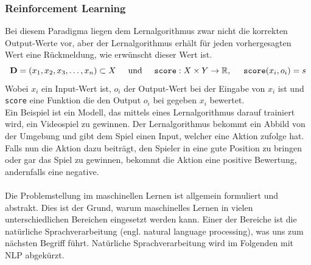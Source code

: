 \documentclass[12pt,letterpaper,ngerman]{article}
\begin{document}
\subsubsection{Reinforcement Learning}
Bei diesem Paradigma liegen dem Lernalgorithmus zwar nicht die korrekten 
Output-Werte vor, aber der Lernalgorithmus erhält für jeden vorhergesagten Wert 
eine Rückmeldung, wie erwünscht dieser Wert ist. 
\[ 
  \mathbf{D} = (x_1, x_2, x_3, \dots, x_n) \subset X 
  \hspace{0.5cm}
  \text{und}
  \hspace{0.5cm}
  \texttt{score}: X \times Y \to \mathbb{R},
  \hspace{0.5cm}
  \texttt{score}(x_i, o_i) = s
\]
Wobei $x_i$ ein Input-Wert ist, $o_i$ der Output-Wert bei der 
Eingabe von $x_i$ ist und \texttt{score} eine Funktion die 
den Output $o_i$ bei gegeben $x_i$ bewertet.\\
Ein Beispiel ist ein Modell,
das mittels eines Lernalgorithmus darauf trainiert wird, ein Videospiel zu 
gewinnen. Der Lernalgorithmus bekommt ein Abbild von der Umgebung und gibt dem 
Spiel einen Input, welcher eine Aktion zufolge hat. Falls nun die Aktion dazu 
beiträgt, den Spieler in eine gute Position zu bringen oder gar das Spiel zu
gewinnen, bekommt die Aktion eine positive Bewertung, andernfalls eine
negative.\\\\
Die Problemstellung im maschinellen Lernen ist allgemein formuliert und abstrakt.
Dies ist der Grund, warum maschinelles Lernen in vielen unterschiedlichen 
Bereichen eingesetzt werden kann. Einer der Bereiche ist die natürliche
Sprachverarbeitung (engl. natural language processing), was uns zum nächsten 
Begriff führt. Natürliche Sprachverarbeitung wird im Folgenden 
mit NLP abgekürzt.
\pagebreak
\end{document}
